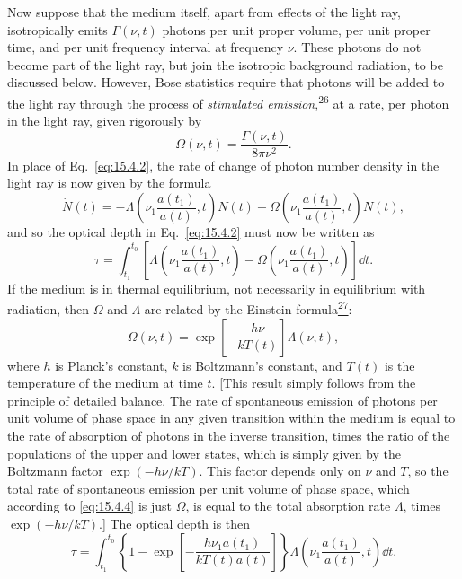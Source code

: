 Now suppose that the medium itself, apart from effects of the light ray,
isotropically emits \(\Gamma(\nu,t)\) photons per unit proper volume, per unit
proper time, and per unit frequency interval at frequency \(\nu\). These
photons do not become part of the light ray, but join the isotropic background
radiation, to be discussed below. However, Bose statistics require that photons
will be added to the light ray through the process of \emph{stimulated
emission},\hyperref[ch15-ref-26]{\textsuperscript{26}} at a rate, per photon
in the light ray, given rigorously by
\begin{equation}
  \Omega(\nu,t)=\frac{\Gamma(\nu,t)}{8\pi\nu^2}.
  \tag{15.4.4}\label{eq:15.4.4}
\end{equation}
In place of Eq.~\eqref{eq:15.4.2}, the rate of change of photon number density
in the light ray is now given by the formula
\begin{equation}
  \dot N(t)
  =
  -\Lambda\left(\nu_1\frac{a(t_1)}{a(t)},t\right)N(t)
  +\Omega\left(\nu_1\frac{a(t_1)}{a(t)},t\right)N(t),
  \tag{15.4.5}\label{eq:15.4.5}
\end{equation}
and so the optical depth in Eq.~\eqref{eq:15.4.2} must now be written as
\begin{equation}
  \tau
  =
  \int_{t_1}^{t_0}
  \left[
    \Lambda\left(\nu_1\frac{a(t_1)}{a(t)},t\right)
    -
    \Omega\left(\nu_1\frac{a(t_1)}{a(t)},t\right)
  \right]\dd t.
  \tag{15.4.6}\label{eq:15.4.6}
\end{equation}
If the medium is in thermal equilibrium, not necessarily in equilibrium with
radiation, then \(\Omega\) and \(\Lambda\) are related by the Einstein
formula\hyperref[ch15-ref-27]{\textsuperscript{27}}:
\begin{equation}
  \Omega(\nu,t)
  =
  \exp\left[-\frac{h\nu}{kT(t)}\right]\Lambda(\nu,t),
  \tag{15.4.7}\label{eq:15.4.7}
\end{equation}
where \(h\) is Planck's constant, \(k\) is Boltzmann's constant, and \(T(t)\)
is the temperature of the medium at time \(t\). [This result simply follows
from the principle of detailed balance. The rate of spontaneous emission of
photons per unit volume of phase space in any given transition within the
medium is equal to the rate of absorption of photons in the inverse transition,
times the ratio of the populations of the upper and lower states, which is
simply given by the Boltzmann factor \(\exp(-h\nu/kT)\). This factor depends
only on \(\nu\) and \(T\), so the total rate of spontaneous emission per unit
volume of phase space, which according to \eqref{eq:15.4.4} is just
\(\Omega\), is equal to the total absorption rate \(\Lambda\), times
\(\exp(-h\nu/kT)\).] The optical depth is then
\begin{equation}
  \tau
  =
  \int_{t_1}^{t_0}
  \left\{
    1-\exp\left[
      -\frac{h\nu_1a(t_1)}{kT(t)a(t)}
    \right]
  \right\}
  \Lambda\left(\nu_1\frac{a(t_1)}{a(t)},t\right)\dd t.
  \tag{15.4.8}\label{eq:15.4.8}
\end{equation}

